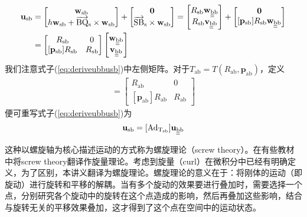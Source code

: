 \documentclass[12pt, a4paper, article, UTF8]{ctexart}
\begin{document}
\begin{align}
\mathbf{u}_\text{sb} &= \begin{bmatrix}
\mathbf{w}_\text{sb} \\ h\mathbf{w}_\text{sb} + \overrightarrow{\text{BQ}}_\text{s} \times \mathbf{w}_\text{sb}
\end{bmatrix} + \begin{bmatrix}
\mathbf{0} \\   \overrightarrow{\text{SB}}_\text{s} \times \mathbf{w}_\text{sb}
\end{bmatrix} = \begin{bmatrix}
R_\text{sb} \mathbf{w}_\text{\underline{\underline{b}}b} \\ 
R_\text{sb} \mathbf{v}_\text{\underline{\underline{b}}b}
\end{bmatrix} + \begin{bmatrix}
\mathbf{0} \\ 
[\mathbf{p}_\text{sb}]R_\text{sb}\mathbf{w}_\text{\underline{\underline{b}}b}
\end{bmatrix} \nonumber \\
&= \begin{bmatrix}
R_\text{sb} & 0\\
[\mathbf{p}_\text{sb}]R_\text{sb} & R_\text{sb}
\end{bmatrix}\begin{bmatrix}
\mathbf{w}_\text{\underline{\underline{b}}b} \\ \mathbf{v}_\text{\underline{\underline{b}}b}
\end{bmatrix} \label{eq:deriveubbusb}
\end{align}
我们注意式子(\ref{eq:deriveubbusb})中左侧矩阵。对于$T_\text{ab}=T(R_\text{ab},\mathbf{p}_\text{ab})$，定义
\begin{align}
[\text{Ad}_{T_\text{ab}}] = \begin{bmatrix}
R_\text{ab}&0\\
[\mathbf{p}_\text{ab}]R_\text{ab}&R_\text{ab}
\end{bmatrix}
\end{align}
便可重写式子(\ref{eq:deriveubbusb})为
\begin{align}
\mathbf{u}_\text{sb} = [\text{Ad}_{\text{T}_\text{sb}}]  \mathbf{u}_\text{\underline{\underline{b}}b}
\end{align}

这种以螺旋轴为核心描述运动的方式称为螺旋理论（screw theory）。在有些教材中将screw theory翻译作旋量理论。考虑到旋量（curl）在微积分中已经有明确定义，为了区别，本讲义翻译为螺旋理论。螺旋理论的意义在于：将刚体的运动（即旋动）进行旋转和平移的解耦。当有多个旋动的效果要进行叠加时，需要选择一个点，分别研究各个旋动中的旋转在这个点造成的影响，然后再叠加这些影响，结合与旋转无关的平移效果叠加，这才得到了这个点在空间中的运动状态。
\end{document}

